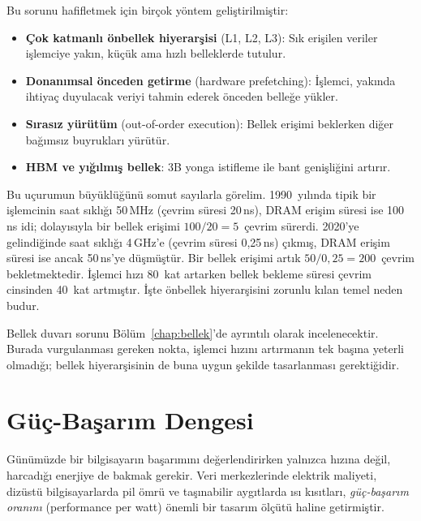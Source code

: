 Bu sorunu hafifletmek için birçok yöntem geliştirilmiştir:
\begin{itemize}
    \item \textbf{Çok katmanlı önbellek hiyerarşisi} (L1, L2, L3): Sık erişilen veriler işlemciye yakın, küçük ama hızlı belleklerde tutulur.
    \item \textbf{Donanımsal önceden getirme} (hardware prefetching): İşlemci, yakında ihtiyaç duyulacak veriyi tahmin ederek önceden belleğe yükler.
    \item \textbf{Sırasız yürütüm} (out-of-order execution): Bellek erişimi beklerken diğer bağımsız buyrukları yürütür.
    \item \textbf{HBM ve yığılmış bellek}: 3B yonga istifleme ile bant genişliğini artırır.
\end{itemize}

Bu uçurumun büyüklüğünü somut sayılarla görelim. 1990~yılında tipik bir işlemcinin saat sıklığı 50\,MHz (çevrim süresi 20\,ns), DRAM erişim süresi ise 100\,ns idi; dolayısıyla bir bellek erişimi $100/20 = 5$~çevrim sürerdi. 2020'ye gelindiğinde saat sıklığı 4\,GHz'e (çevrim süresi 0,25\,ns) çıkmış, DRAM erişim süresi ise ancak 50\,ns'ye düşmüştür. Bir bellek erişimi artık $50/0{,}25 = 200$~çevrim bekletmektedir. İşlemci hızı 80~kat artarken bellek bekleme süresi çevrim cinsinden 40~kat artmıştır. İşte önbellek hiyerarşisini zorunlu kılan temel neden budur.

Bellek duvarı sorunu Bölüm~\ref{chap:bellek}'de ayrıntılı olarak incelenecektir. Burada vurgulanması gereken nokta, işlemci hızını artırmanın tek başına yeterli olmadığı; bellek hiyerarşisinin de buna uygun şekilde tasarlanması gerektiğidir.


\section{Güç-Başarım Dengesi}
\label{sec:guc-basarim}

Günümüzde bir bilgisayarın başarımını değerlendirirken yalnızca hızına değil, harcadığı enerjiye de bakmak gerekir. Veri merkezlerinde elektrik maliyeti, dizüstü bilgisayarlarda pil ömrü ve taşınabilir aygıtlarda ısı kısıtları, \emph{güç-başarım oranını} (performance per watt) önemli bir tasarım ölçütü haline getirmiştir.

